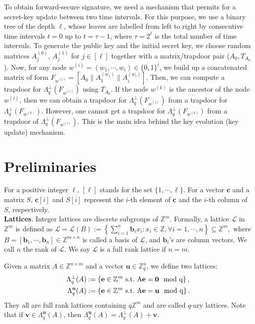\documentclass[runningheads]{llncs}
\def\ZZ{\mathbb{Z}}
\def\bf{\mathbf}
\def\calL{\mathcal{L}}
\def\e{\bf{e}}
\def\L{\Lambda}
\def\Lp{\Lambda^{\perp}}
\def\b{\bf{b}}
\begin{document}
To obtain forward-secure signature, we need a mechanism that permits for a secret-key update
between two time intervals.
For this purpose, we use a binary tree of the depth $\ell$, 
whose leaves are labelled from left to right by consecutive time intervals $t=0$ up to $t=\tau-1$,
where $\tau=2^{\ell}$ is the total number of time intervals.
To generate the public key and the initial secret key, we choose random matrices 
$A_j^{(0)}$, $A_j^{(1)}$ for $j \in [\ell] $ together with a matrix/trapdoor pair  ($A_0, T_{A_0}$). 
Now, for any node $w^{(i)}=(w_1,\cdots, w_{i}) \in \{0,1\}^i$, 
we build up a concatenated matrix of form $F_{w^{(i)}}=[A_0\|A_1^{(w_1)} \|A_i^{(w_i)}]$. 
Then, we can compute a trapdoor for $\L_q^{\bot}(F_{w^{(i)}})$ using $T_{A_0}$. 
If the node $w^{(k)}$ is the ancestor of the node $w^{(i)}$, then we can obtain a trapdoor for $\L_q^{\bot}(F_{w^{(i)}} )$ 
from a trapdoor for $\L_q^{\bot}(F_{w^{(k)}} )$. 
However, one cannot get a trapdoor for $\L_q^{\bot}(F_{w^{(k)}} )$ from a trapdoor of $\L_q^{\bot}(F_{w^{(i)}} )$. 
This is the main idea behind the key evolution (key update) mechanism.


\section{Preliminaries} \label{lattices}
%
For a positive integer $\ell$, $[\ell]$ stands for the set $\{1, \cdots, \ell\}$. 
For a vector $\bf{c}$ and a matrix $S$, 
$\bf{c}[i]$ and $S[i]$ represent the $i$-th element of $\bf{c}$ and the $i$-th column of  $S$, respectively.\\
 
 
\noindent \textbf{Lattices}. Integer lattices are discrete subgroups of $\ZZ^m$. Formally, a lattice $\calL$ in $\ZZ^m$ is defined as
$\calL=\calL(B):=\left\{\sum_{i=1}^n\b_ix_i : x_i\in\ZZ,\forall i=1,\cdots,n \right\}\subseteq\ZZ^m,$
where $B=[\b_1,\cdots,\b_n]\in\ZZ^{m\times n}$ is called a basis of $\calL$, and $\b_i$'s are column vectors.
We call $n$ the rank of $\calL$. We say $\calL$ is a full rank lattice  if $n=m$. 

Given a matrix $A\in\ZZ^{n\times m}$ and a vector  $\bf{u}\in\ZZ_q^n$, we define two lattices: 
\begin{align*}
\Lp_q(A) &:= \left\{ \e\in\ZZ^m~\rm{s.t.}~A\e={\bf 0}\mod q \right\}, \\
\L_q^{\bf{u}}(A) &:=  \left\{ \e\in\ZZ^m~\rm{s.t.}~A\e=\bf{u}\mod q \right\}.
\end{align*}
They all are full rank lattices containing $q\ZZ^m$ and are called $q$-ary lattices. 
Note that if $\bf{v}\in\L_q^{\bf{u}}(A)$, then $\L_q^{\bf{u}}(A)=\Lp_q(A)+\bf{v}$.
\end{document}
